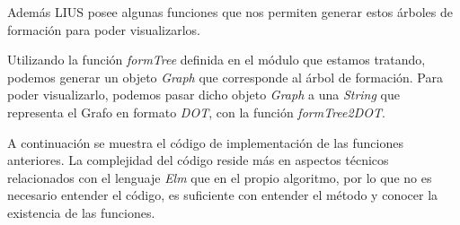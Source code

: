\documentclass[a4paper]{report}
\begin{document}
Además LIUS posee algunas funciones que nos permiten generar estos árboles de formación para poder visualizarlos.

Utilizando la función \textit{formTree} definida en el módulo que estamos tratando, podemos generar un objeto \textit{Graph} que corresponde al árbol de formación. Para poder visualizarlo, podemos pasar dicho objeto \textit{Graph} a una \textit{String} que representa el Grafo en formato \textit{DOT}, con la función \textit{formTree2DOT}. 

\noindent{}

A continuación se muestra el código de implementación de las funciones anteriores. La complejidad del código reside más en aspectos técnicos relacionados con el lenguaje \textit{Elm} que en el propio algoritmo, por lo que no es necesario entender el código, es suficiente con entender el método y conocer la existencia de las funciones.\\

\newpage
\end{document}
